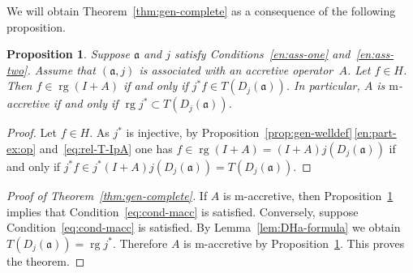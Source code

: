 \documentclass[a4paper,oneside,12pt]{amsart}
\theoremstyle{plain}
\newtheorem{proposition}[theorem]{Proposition}
\theoremstyle{definition}
\begin{document}
We will obtain Theorem~\ref{thm:gen-complete} as a consequence of the following proposition.
\begin{proposition}\label{prop:gen-complete-helper}
Suppose ${{\mathfrak{{a}}}}$ and $j$ satisfy Conditions~\ref{en:ass-one} and~\ref{en:ass-two}. Assume that $({{\mathfrak{{a}}}},j)$ is associated with an accretive operator~$A$.
Let $f\in H$.
Then $f\in\operatorname{rg}(I+A)$ if and only if $j^*f\in T(D_j({{\mathfrak{{a}}}}))$.
In particular, $A$ is {\ensuremath{\text{m}}}-accretive if and only if $\operatorname{rg} j^*\subset T(D_j({{\mathfrak{{a}}}}))$.
\end{proposition}
\begin{proof}
Let $f\in H$.
As $j^*$ is injective, by Proposition~\ref{prop:gen-welldef}\,\ref{en:part-ex:op} and~\eqref{eq:rel-T-IpA} one has $f\in\operatorname{rg}(I+A)=(I+A)j(D_j({{\mathfrak{{a}}}}))$ if and only if
$j^*f\in j^*(I+A)j(D_j({{\mathfrak{{a}}}}))= T(D_j({{\mathfrak{{a}}}}))$.
\end{proof}

\begin{proof}[Proof of Theorem~\ref{thm:gen-complete}]
If $A$ is {\ensuremath{\text{m}}}-accretive, then Proposition~\ref{prop:gen-complete-helper} implies that Condition~\eqref{eq:cond-macc} is satisfied.
Conversely, suppose Condition~\eqref{eq:cond-macc} is satisfied.
By Lemma~\ref{lem:DHa-formula} we obtain $T(D_j({{\mathfrak{{a}}}}))=\operatorname{rg} j^*$. Therefore $A$ is {\ensuremath{\text{m}}}-accretive by
Proposition~\ref{prop:gen-complete-helper}. This proves the theorem.
\end{proof}
\end{document}
